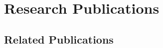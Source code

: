 \documentclass[epsfig,a4paper,11pt,titlepage]{book}
\newcommand{\clearemptydoublepage}{\newpage{\pagestyle{empty}\cleardoublepage}}
\numberwithin{algorithm}{chapter}
\begin{document}
\clearemptydoublepage




\thispagestyle{empty}
\makeatletter



\clearemptydoublepage

\appendix


\iffalse

\chapter{Basic Algorithms}
Proxy re-encryption and
Keywork encryption

\chapter{Security Proof of Basic Algorithms}
Proofs of both 
Proxy re-encryption and 
Keywork encryption

\fi


\chapter{Research Publications}
\label{app:publications}

\section{Related Publications}
\label{app:selected-publications}
 
 
\end{document}
